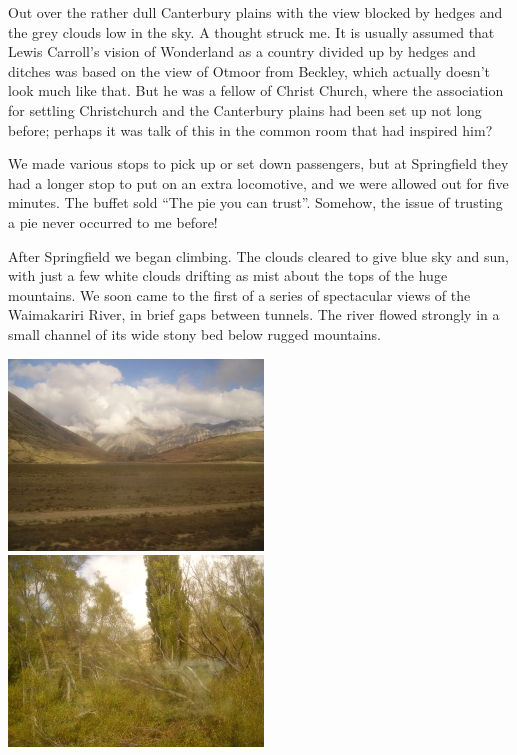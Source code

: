 \documentclass[12pt,a4paper]{article}
\begin{document}
Out over the rather dull Canterbury plains with the view blocked by hedges
and the grey clouds low in the sky.
A thought struck me. It is usually assumed that Lewis Carroll's vision of
Wonderland as a country divided up by hedges and ditches was based on
the view of Otmoor from Beckley, which actually doesn't look much like
that. But he was a fellow of Christ Church, where the association for
settling Christchurch and the Canterbury plains had been set up not long
before; perhaps it was talk of this in the common room that had inspired him?

We made various stops to pick up or set down passengers, but at Springfield
they had a longer stop to put on an extra locomotive, and we were allowed
out for five minutes. The buffet sold ``The pie you can trust''. Somehow, the
issue of trusting a pie never occurred to me before!

After Springfield we began climbing. The clouds cleared to give blue sky and
sun, with just a few white clouds drifting as mist about the tops of the huge
mountains. We soon came to the first of a series
of spectacular views of the Waimakariri River, in brief gaps between
tunnels. The river flowed strongly in a small channel of its wide stony
bed below rugged mountains.

\begin{center}
\includegraphics[scale=0.5]{clouds.jpg}\qquad
\includegraphics[scale=0.5]{alpine.jpg}
\end{center}
\end{document}
